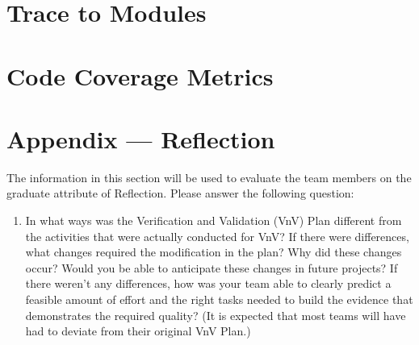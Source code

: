 \documentclass[12pt, titlepage]{article}
\begin{document}
\section{Trace to Modules}		

\section{Code Coverage Metrics}




\newpage{}
\section*{Appendix --- Reflection}

The information in this section will be used to evaluate the team members on the
graduate attribute of Reflection.  Please answer the following question:

\begin{enumerate}
  \item In what ways was the Verification and Validation (VnV) Plan different
  from the activities that were actually conducted for VnV?  If there were
  differences, what changes required the modification in the plan?  Why did
  these changes occur?  Would you be able to anticipate these changes in future
  projects?  If there weren't any differences, how was your team able to clearly
  predict a feasible amount of effort and the right tasks needed to build the
  evidence that demonstrates the required quality?  (It is expected that most
  teams will have had to deviate from their original VnV Plan.)
\end{enumerate}
\end{document}
